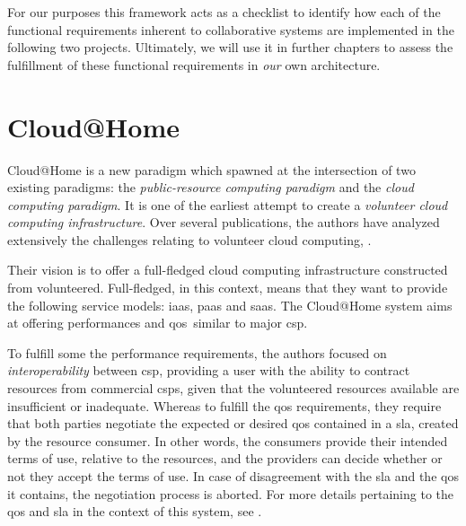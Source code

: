 \documentclass[12pt, titlepage]{uo_temp}
\begin{document}
     For our purposes this framework acts as a checklist to identify how each of the
     functional requirements inherent to collaborative systems are implemented in the
     following two projects. Ultimately, we will use it in further chapters to assess the
     fulfillment of these functional requirements in \emph{our} own architecture.

     \section{Cloud@Home}
     Cloud@Home is a new paradigm which spawned at the intersection of two existing
     paradigms: the \emph{public-resource computing paradigm} and the \emph{cloud
       computing paradigm}. It is one of the earliest attempt to create a \emph{volunteer
       cloud computing infrastructure}. Over several publications, the authors have
     analyzed extensively the challenges relating to volunteer cloud computing,
     \cite{cunsolo2009volunteer} \cite{aversa2011cloudperf} \cite{aversa2011cloud}
     \cite{cunsolo2010applying} \cite{cunsolo2010volunteer} \cite{distefano2010taxonomic}
     \cite{cathome6} \cite{cunsolo2010cloud} \cite{cathome9} \cite{cathome11}
     \cite{distefano2011qos}.

     Their vision is to offer a full-fledged cloud computing infrastructure constructed
     from volunteered. Full-fledged, in this context, means that they want to provide the
     following service models: \gls{iaas}, \gls{paas} and \gls{saas}. The Cloud@Home
     system aims at offering performances and \gls{qos}\ similar to major \gls{csp}.

     To fulfill some the performance requirements, the authors focused on
     \emph{interoperability} between \gls{csp}, providing a user with the ability to
     contract resources from commercial \gls{csp}s, given that the volunteered resources
     available are insufficient or inadequate. Whereas to fulfill the \gls{qos}
     requirements, they require that both parties negotiate the expected or desired
     \gls{qos} contained in a \gls{sla}, created by the resource consumer. In other words,
     the consumers provide their intended terms of use, relative to the resources, and the
     providers can decide whether or not they accept the terms of use. In case of
     disagreement with the \gls{sla} and the \gls{qos} it contains, the negotiation
     process is aborted. For more details pertaining to the \gls{qos} and \gls{sla} in the
     context of this system, see \cite{distefano2011qos}.
\end{document}
